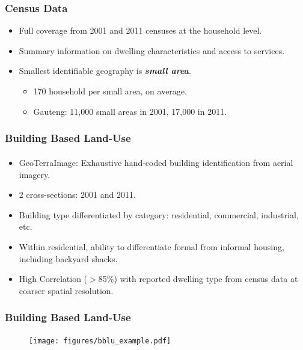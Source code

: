 \documentclass[aspectratio=32]{beamer}
\begin{document}

\begin{frame}
\frametitle{Census Data}
\begin{itemize}
  \item Full coverage from 2001 and 2011 censuses at the household level.
  \vspace{-2mm}
  \item Summary information on dwelling characteristics and access to services.
  \vspace{2mm}
  \item Smallest identifiable geography is {\it\bf small area}.
  \begin{itemize}
  \item 170 household per small area, on average.
  \item Gauteng: 11,000 small areas in 2001, 17,000 in 2011.
  \end{itemize}
\end{itemize}
\end{frame}


\begin{frame}
\frametitle{Building Based Land-Use}

\begin{itemize}

  \item GeoTerraImage\textsuperscript{\tiny\textcopyright}: Exhaustive hand-coded building identification from aerial imagery.
  \vspace{2mm}
  \item 2 cross-sections: 2001 and 2011. 
  \vspace{2mm}
  \item Building type differentiated by category: residential, commercial, industrial, etc.
  \vspace{2mm}
  \item Within residential, ability to differentiate formal from informal housing, including backyard shacks.
  \vspace{2mm}
  \item High Correlation ($>$85\%) with reported dwelling type from census data at coarser spatial resolution.
\end{itemize}
\end{frame}


\begin{frame}
\frametitle{Building Based Land-Use}

\begin{figure}
 \texttt{[image: figures/bblu\_example.pdf]} 
\end{figure}
\end{frame}
\end{document}
